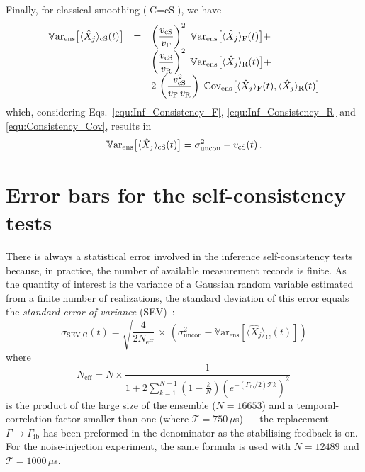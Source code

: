 \documentclass[aps,prx,onecolumn,superscriptaddress,floatfix,longbibliography,amsmath,amssymb]{revtex4-2}
\newcommand{\fil}{_{\text F}}
\newcommand{\rfil}{_{\text R}}
\newcommand{\csm}{_{\rm cS}}
\begin{document}
Finally, for classical smoothing ($\text{C}=\text{cS}$), we have
\begin{equation}
\begin{array}{rcl}
    \mathbb{V}\text{ar}_{\text{ens}}\big[\langle\hat{X}_j\rangle_\text{cS}(t)\big] & = & \left(\dfrac{v\csm}{v\fil}\right)^2\;\mathbb{V}\text{ar}_{\text{ens}}\big[\langle\hat{X}_j\rangle_\text{F}(t)\big]+\\&&\left(\dfrac{v\csm}{v\rfil}\right)^2\;\mathbb{V}\text{ar}_{\text{ens}}\big[\langle\hat{X}_j\rangle_\text{R}(t)\big]+\\&&
    2\,\left(\dfrac{v\csm^2}{v\fil\,v\rfil}\right)\;
    \mathbb{C}\text{ov}_{\text{ens}}\big[\langle\hat{X}_j\rangle_\text{F}(t),\langle\hat{X}_j\rangle_\text{R}(t)\big]
    \label{equ:VarX_cS}
\end{array}
\end{equation}
which, considering Eqs.~\eqref{equ:Inf_Consistency_F}, \eqref{equ:Inf_Consistency_R} and \eqref{equ:Consistency_Cov}, results in
\begin{equation}
    \mathbb{V}\text{ar}_{\text{ens}}\big[\langle\hat{X}_j\rangle_\text{cS}(t)\big] = \sigma^2_\text{uncon} - v\csm(t)\,.
\end{equation}

\section{Error bars for the self-consistency tests}\label{sec:ErrorBars_forSC}

There is always a statistical error involved in the inference self-consistency tests because, in practice, the number of available measurement records is finite. As the quantity of interest is the variance of a Gaussian random variable estimated from a finite number of realizations, the standard deviation of this error equals the \textit{standard error of variance} (SEV)~\cite{bayley1946effective}:
\begin{equation}
    \sigma_\text{SEV,C}(t) = \sqrt{\dfrac{4}{2N_\text{eff}}}\,\times\,\left(\sigma^2_\text{uncon}-\mathbb{V}\mathrm{ar}_{\text{ens}}\left[\langle\hat{X}_j\rangle_\text{C}(t)\right]\right)
\end{equation}
where
\begin{equation}
    N_\text{eff} = N\times\dfrac{1}{1+2\displaystyle\sum_{k=1}^{N-1}\left(1-\frac{k}{N}\right)\left(e^{-(\Gamma_\text{fb}/2)\mathcal{T}k}\right)^2}\,
\end{equation}
is the product of the large size of the ensemble ($N=16653$) and a temporal-correlation factor smaller than one (where $\mathcal{T}=750\,\mu$s) --- the replacement $\Gamma\to\Gamma_\text{fb}$ has been preformed in the denominator as the stabilising feedback is on. For the noise-injection experiment, the same formula is used with $N=12489$ and $\mathcal{T}=1000\,\mu$s.
\end{document}
